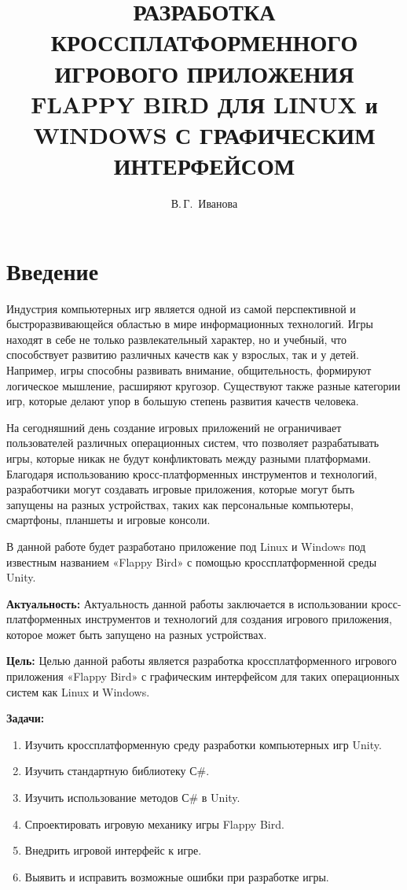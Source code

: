 \documentclass[14pt, oneside]{altsu-report}
\title{РАЗРАБОТКА КРОССПЛАТФОРМЕННОГО ИГРОВОГО ПРИЛОЖЕНИЯ FLAPPY BIRD ДЛЯ LINUX и WINDOWS С ГРАФИЧЕСКИМ ИНТЕРФЕЙСОМ}
\author{В.\,Г.~Иванова}
\institute{Институт цифровых технологий, электроники и физики}
\date{\the\year}
\begin{document}
\maketitle

\setcounter{page}{2}
\makeabstract
\tableofcontents

\chapter*{Введение}

Индустрия компьютерных игр является одной из самой перспективной и быстроразвивающейся областью в мире информационных технологий. Игры находят в себе не только развлекательный характер, но и учебный, что способствует развитию различных качеств как у взрослых, так и у детей. Например, игры способны развивать внимание, общительность, формируют логическое мышление, расширяют кругозор. Существуют также разные категории игр, которые делают упор в большую степень развития качеств человека.

На сегодняшний день создание игровых приложений не ограничивает пользователей различных операционных систем, что позволяет разрабатывать игры, которые никак не будут конфликтовать между разными платформами. Благодаря использованию кросс-платформенных инструментов и технологий, разработчики могут создавать игровые приложения, которые могут быть запущены на разных устройствах, таких как персональные компьютеры, смартфоны, планшеты и игровые консоли.

В данной работе будет разработано приложение под  Linux и Windows под известным названием «Flappy Bird» с помощью кроссплатформенной среды Unity.

\textbf{Актуальность:} 
Актуальность данной работы заключается в использовании кросс-платформенных инструментов и технологий для создания игрового приложения, которое может быть запущено на разных устройствах. 

\textbf{Цель:}
Целью данной работы является разработка кроссплатформенного игрового приложения «Flappy Bird» с графическим интерфейсом для таких операционных систем как Linux и Windows.

\textbf{Задачи:}
\begin{enumerate}
\item Изучить кроссплатформенную среду разработки компьютерных игр Unity.
\item Изучить стандартную библиотеку С\#.
\item Изучить использование методов С\# в Unity.
\item Спроектировать игровую механику игры Flappy Bird.
\item Внедрить игровой интерфейс к игре.
\item Выявить и исправить возможные ошибки при разработке игры.
\end{enumerate}
\end{document}
